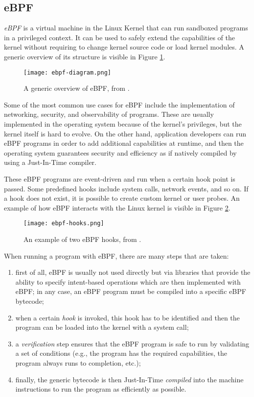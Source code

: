 \subsection{eBPF}
\textit{eBPF} \cite{ebpf} is a virtual machine in the Linux Kernel that can run sandboxed programs
in a privileged context. It can be used to safely extend the capabilities of the kernel
without requiring to change kernel source code or load kernel modules. A generic overview of its structure
is visible in Figure \ref{fig:ebpf-generic-overview}.

\begin{figure}[ht]
  \centering
  \texttt{[image: ebpf-diagram.png]}
  \caption{A generic overview of eBPF, from \cite{ebpf}.}
  \label{fig:ebpf-generic-overview}
\end{figure}

Some of the most common use cases for eBPF include the implementation of networking, security, and
observability of programs. These are usually implemented in the operating system because of the kernel's
privileges, but the kernel itself is hard to evolve.
On the other hand, application developers can run eBPF programs in order to add additional capabilities at runtime,
and then the operating system guarantees security and efficiency as if natively compiled
by using a Just-In-Time compiler.

These eBPF programs are event-driven and run when a certain hook point is passed. Some
predefined hooks include system calls, network events, and so on. If a hook does not exist,
it is possible to create custom kernel or user probes. An example of how eBPF interacts with the
Linux kernel is visible in Figure \ref{fig:example-ebpf-hooks}.

\begin{figure}[ht]
  \centering
  \texttt{[image: ebpf-hooks.png]}
  \caption{An example of two eBPF hooks, from \cite{ebpf-description}.}
  \label{fig:example-ebpf-hooks}
\end{figure}

When running a program with eBPF, there are many steps that are taken:
\begin{enumerate}
  \item first of all, eBPF is usually not used directly but via libraries that provide the ability to specify
        intent-based operations which are then implemented with eBPF; in any case, an eBPF program must be
        compiled into a specific eBPF bytecode;
  \item when a certain \textit{hook} is invoked, this hook has to be identified and then the program can be loaded
        into the kernel with a system call;
  \item a \textit{verification} step ensures that the eBPF program is safe to run by validating a set of conditions
        (e.g., the program has the required capabilities, the program always runs to completion, etc.);
  \item finally, the generic bytecode is then Just-In-Time \textit{compiled} into the machine instructions
        to run the program as efficiently as possible.
\end{enumerate}

